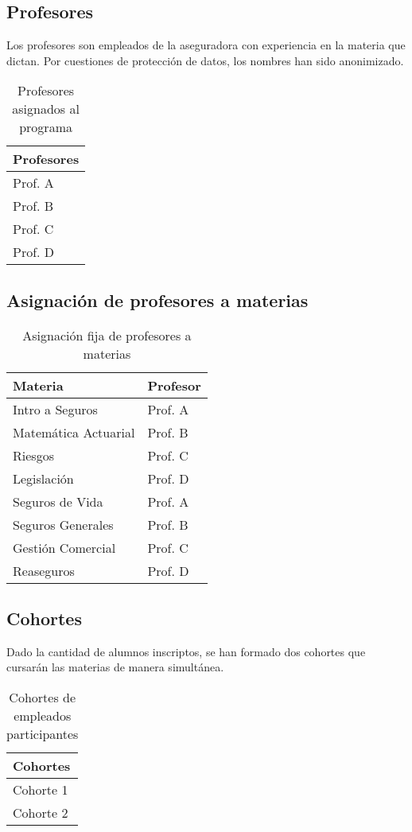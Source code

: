 \newpage

\subsection*{Profesores}
Los profesores son empleados de la aseguradora con experiencia en la materia que dictan. Por cuestiones de protección de datos, los nombres han sido anonimizado.
\begin{table}[ht]
\centering
\begin{tabular}{|l|}
\hline
	\textbf{Profesores} \\
\hline
Prof. A \\
Prof. B \\
Prof. C \\
Prof. D \\
\hline
\end{tabular}
\caption{Profesores asignados al programa}
\end{table}

\subsection*{Asignación de profesores a materias}
\begin{table}[ht]
\centering
\begin{tabular}{|l|l|}
\hline
	\textbf{Materia} & \textbf{Profesor} \\
\hline
Intro a Seguros & Prof. A \\
Matemática Actuarial & Prof. B \\
Riesgos & Prof. C \\
Legislación & Prof. D \\
Seguros de Vida & Prof. A \\
Seguros Generales & Prof. B \\
Gestión Comercial & Prof. C \\
Reaseguros & Prof. D \\
\hline
\end{tabular}
\caption{Asignación fija de profesores a materias}
\end{table}

\subsection*{Cohortes}
Dado la cantidad de alumnos inscriptos, se han formado dos cohortes que cursarán las materias de manera simultánea.
\begin{table}[ht]
\centering
\begin{tabular}{|l|}
\hline
	\textbf{Cohortes} \\
\hline
Cohorte 1 \\
Cohorte 2 \\
\hline
\end{tabular}
\caption{Cohortes de empleados participantes}
\end{table}

